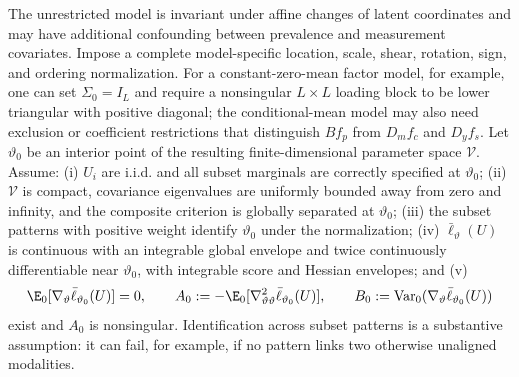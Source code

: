 \begin{assumption}
\label{ass:lg_regular}
The unrestricted model is invariant under affine changes of latent
coordinates and may have additional confounding between prevalence and
measurement covariates.  Impose a complete model-specific location, scale,
shear, rotation, sign, and ordering normalization.  For a constant-zero-mean
factor model, for example, one can set $\Sigma_0=I_L$ and require a
nonsingular $L\times L$ loading block to be lower triangular with positive
diagonal; the
conditional-mean model may also need exclusion or coefficient restrictions
that distinguish $Bf_p$ from $D_mf_c$ and $D_yf_s$.  Let $\vartheta_0$ be an
interior point of the resulting finite-dimensional parameter space
$\mathcal V$.  Assume: (i) $U_i$ are i.i.d. and all subset marginals are
correctly specified at $\vartheta_0$; (ii) $\mathcal V$ is compact,
covariance eigenvalues are uniformly bounded away
from zero and infinity, and the composite criterion is globally separated at
$\vartheta_0$; (iii) the subset patterns with positive weight identify
$\vartheta_0$ under the normalization; (iv) $\bar\ell_\vartheta(U)$ is
continuous with an integrable global envelope and twice continuously
differentiable near $\vartheta_0$, with integrable score and Hessian envelopes;
and (v)
\[
 \E_0[\nabla_\vartheta\bar\ell_{\vartheta_0}(U)]=0,\qquad
 A_0:=-\E_0[\nabla^2_{\vartheta\vartheta}
 \bar\ell_{\vartheta_0}(U)],\qquad
 B_0:=\mathrm{Var}_0(\nabla_\vartheta\bar\ell_{\vartheta_0}(U))
\]
exist and $A_0$ is nonsingular.  Identification across subset patterns is a
substantive assumption: it can fail, for example, if no pattern links two
otherwise unaligned modalities.
\end{assumption}

